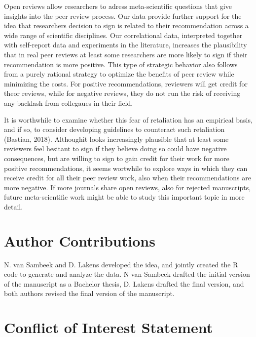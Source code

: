 \documentclass[,jou, a4paper,floatsintext]{apa6}
\begin{document}
Open reviews allow researchers to adress meta-scientific questions that give insights into the peer review process. Our data provide further support for the idea that researchers decision to sign is related to their recommendation across a wide range of scientific disciplines. Our correlational data, interpreted together with self-report data and experiments in the literature, increases the plausibility that in real peer reviews at least some researchers are more likely to sign if their recommendation is more positive. This type of strategic behavior also follows from a purely rational strategy to optimize the benefits of peer review while minimizing the costs. For positive recommendations, reviewers will get credit for theor reviews, while for negative reviews, they do not run the risk of receiving any backlash from collegaues in their field.

It is worthwhile to examine whether this fear of retaliation has an empirical basis, and if so, to consider developing guidelines to counteract such retaliation (Bastian, 2018). Althoughit looks increasingly plausible that at least some reviewers feel hesitant to sign if they believe doing so could have negative consequences, but are willing to sign to gain credit for their work for more positive recommendations, it seems wortwhile to explore ways in which they can receive credit for all their peer review work, also when their recommendations are more negative. If more journals share open reviews, also for rejected manuscripts, future meta-scientific work might be able to study this important topic in more detail.

\hypertarget{author-contributions}{%
\section{Author Contributions}\label{author-contributions}}

N. van Sambeek and D. Lakens developed the idea, and jointly created the R code to generate and analyze the data. N van Sambeek drafted the initial version of the manuscript as a Bachelor thesis, D. Lakens drafted the final version, and both authors revised the final version of the manuscript.

\hypertarget{conflict-of-interest-statement}{%
\section{Conflict of Interest Statement}\label{conflict-of-interest-statement}}
\end{document}
